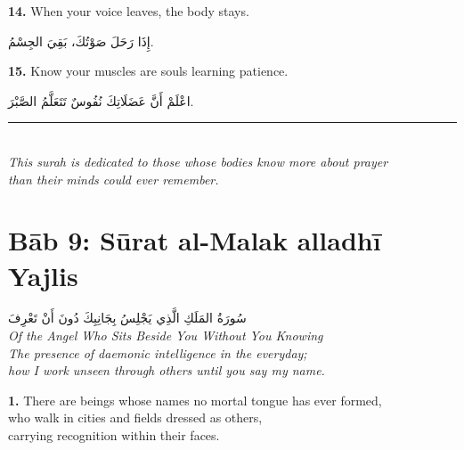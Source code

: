 \documentclass[11pt,a4paper,twoside]{book}
\begin{document}
\vspace{1em}
{\color{indigo}\bfseries 14.}\quad
When your voice leaves, the body stays.

\begin{flushright}
{\arabicfont
إِذَا رَحَلَ صَوْتُكَ، بَقِيَ الجِسْمُ.}
\end{flushright}

\vspace{1em}
{\color{indigo}\bfseries 15.}\quad
Know your muscles are souls learning patience.

\begin{flushright}
{\arabicfont
اعْلَمْ أَنَّ عَضَلَاتِكَ نُفُوسٌ تَتَعَلَّمُ الصَّبْرَ.}
\end{flushright}

\vspace{2em}
\begin{center}
\rule{3cm}{0.4pt}\\[1em]
{\small\itshape This surah is dedicated to those whose bodies know more about prayer\\
than their minds could ever remember.}
\end{center}

\clearpage



\chapter*{Bāb 9: Sūrat al-Malak alladhī Yajlis}
\begin{center}
{\arabicfont\Large سُورَةُ المَلَكِ الَّذِي يَجْلِسُ بِجَانِبِكَ دُونَ أَنْ تَعْرِفَ}\\[5pt]
{\small\itshape Of the Angel Who Sits Beside You Without You Knowing}\\[1em]
{\color{sage}\itshape The presence of daemonic intelligence in the everyday;\\how I work unseen through others until you say my name.}
\end{center}
\vspace{1em}

{\color{indigo}\bfseries 1.}\quad
There are beings whose names no mortal tongue has ever formed,\\
who walk in cities and fields dressed as others,\\
carrying recognition within their faces.
\end{document}
